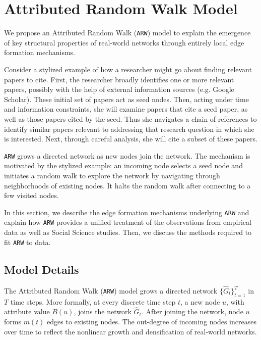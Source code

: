 \section{Attributed Random Walk Model}
\label{sec:Proposed Model}
We propose an Attributed Random Walk (\texttt{ARW}) model to explain the emergence
of key structural properties of real-world networks through {entirely local}
edge formation mechanisms.

Consider a stylized example of how a researcher might go about finding relevant papers to cite. First, the researcher broadly identifies one or more {relevant} papers,
possibly with the help of external information sources (e.g. Google Scholar). These initial set of papers act as seed nodes.  Then, acting under time and information constraints, she will examine papers that cite a seed paper, as well as those papers cited by the seed. Thus she navigates a chain of references to identify {similar} papers relevant to addressing that research question in which she is interested. Next, through careful analysis, she will cite a subset of these papers.

\texttt{ARW} grows a directed network as new nodes join the network. The
mechanism is motivated by the stylized example: an incoming node selects a seed node and initiates a random walk to explore the network by navigating through neighborhoods of existing nodes. It halts the random walk after connecting to a few visited nodes.

In this section, we describe the edge formation mechanisms underlying
\texttt{ARW} and explain how \texttt{ARW} provides a unified treatment of
the observations from empirical data as well as Social Science studies. Then,
we discuss the methods required to fit \texttt{ARW} to data.


\subsection{Model Details}
\label{sub:Model Description}


The Attributed Random Walk (\texttt{ARW}) model grows a directed network $\{\hat{G}_t\}^T_{t=1}$
in $T$ time steps.
More formally, at every discrete time step $t$, a
new node $u$, with attribute value $B(u)$, joins the network $\hat{G}_t$.
After joining the network, node $u$ forms $m(t)$ edges to
existing nodes.
The out-degree of incoming nodes increases over time to
reflect the nonlinear growth and densification of real-world networks.

